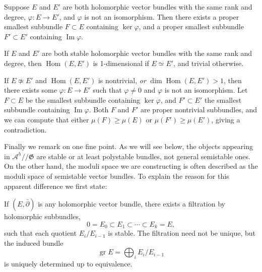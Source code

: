\documentclass[12pt,letterpaper,reqno]{article}
\numberwithin{equation}{section}
\newcommand{\fG}{{\mathfrak G}}
\newcommand{\cA}{\ensuremath{\mathcal A}}
\newcommand{\kq}{/\!\!/}
\newcommand{\ti}[1]{\textit{#1}}
\DeclareMathOperator{\im}{Im}
\DeclareMathOperator{\Hom}{Hom}
\DeclareMathOperator{\gr}{gr}
\newcommand{\fixme}[1]{{\color{orange}{[#1]}}}
\begin{document}
\begin{lem} 
Suppose $E$ and $E'$ are both
holomorphic vector bundles with the same rank and degree,
$\varphi: E \to E'$, and $\varphi$ is not an isomorphism.
Then there exists a proper smallest subbundle $F \subset E$ containing
$\ker \varphi$, and a proper smallest subbundle $F' \subset E'$
containing $\im \varphi$.
\end{lem}
\begin{pf} \fixme{...}
\end{pf}

\begin{prop} If $E$ and $E'$ are both stable
holomorphic vector bundles with the same rank and degree, 
then $\Hom(E,E')$ is 1-dimensional if $E \simeq E'$,
and trivial otherwise.
\end{prop}
\begin{pf}
If $E \not \simeq E'$ and $\Hom(E,E')$ is nontrivial, \ti{or}
$\dim \Hom(E,E') > 1$, then there exists some $\varphi: E \to E'$ 
such that $\varphi \neq 0$ and $\varphi$ is not an isomorphism.
Let $F \subset E$ be the smallest subbundle containing $\ker \varphi$,
and $F' \subset E'$ the smallest subbundle containing $\im \varphi$.
Both $F$ and $F'$ are proper nontrivial subbundles, and we can compute 
that either $\mu(F) \ge \mu(E)$ or $\mu(F') \ge\mu(E')$, giving a 
contradiction.
\end{pf}

Finally we remark on one fine point.
As we will see below, the objects appearing in $\cA^h \kq \fG$
are stable or at least polystable bundles,
not general semistable ones. On the other hand, the moduli space
we are constructing is often described as the moduli space of
semistable vector bundles. To explain the reason for this apparent difference
we first state:

\begin{prop} 
If $(E, \bar\partial)$ is any holomorphic vector bundle,
there exists a filtration by holomorphic subbundles,
\begin{equation}
 0 = E_0 \subset E_1 \subset \cdots \subset E_k = E,
\end{equation}
such that each quotient $E_i / E_{i-1}$ is stable.
The filtration need not be unique, but the induced
bundle
\begin{equation}
  \gr E = \bigoplus_i E_i / E_{i-1}
\end{equation}
is uniquely determined up to equivalence.
\end{prop}
\end{document}
